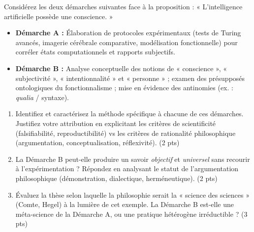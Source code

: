 \documentclass[11pt]{article}
\begin{document}
\begin{exercice}
Considérez les deux démarches suivantes face à la proposition : « L'intelligence artificielle possède une conscience. »
\begin{itemize}
    \item \textbf{Démarche A :} Élaboration de protocoles expérimentaux (tests de Turing avancés, imagerie cérébrale comparative, modélisation fonctionnelle) pour corréler états computationnels et rapports subjectifs.
    \item \textbf{Démarche B :} Analyse conceptuelle des notions de « conscience », « subjectivité », « intentionnalité » et « personne » ; examen des présupposés ontologiques du fonctionnalisme ; mise en évidence des antinomies (ex. : \textit{qualia} / syntaxe).
\end{itemize}
\begin{enumerate}
    \item Identifiez et caractérisez la méthode spécifique à chacune de ces démarches. Justifiez votre attribution en explicitant les critères de scientificité (falsifiabilité, reproductibilité) vs les critères de rationalité philosophique (argumentation, conceptualisation, réflexivité). (2 pts)
    \item La Démarche B peut-elle produire un savoir \textit{objectif} et \textit{universel} sans recourir à l'expérimentation ? Répondez en analysant le statut de l'argumentation philosophique (démonstration, dialectique, herméneutique). (2 pts)
    \item Évaluez la thèse selon laquelle la philosophie serait la « science des sciences » (Comte, Hegel) à la lumière de cet exemple. La Démarche B est-elle une méta-science de la Démarche A, ou une pratique hétérogène irréductible ? (3 pts)
\end{enumerate}
\end{exercice}
\end{document}

